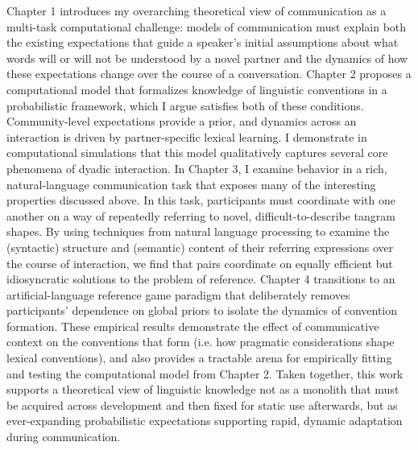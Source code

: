 Chapter 1 introduces my overarching theoretical view of communication as a multi-task computational challenge: models of communication must explain both the existing expectations that guide a speaker's initial assumptions about what words will or will not be understood by a novel partner and the dynamics of how these expectations change over the course of a conversation. %
Chapter 2 proposes a computational model that formalizes knowledge of linguistic conventions in a probabilistic framework, which I argue satisfies both of these conditions.
Community-level expectations provide a prior, and dynamics across an interaction is driven by partner-specific lexical learning. 
I demonstrate in computational simulations that this model qualitatively captures several core phenomena of dyadic interaction.
In Chapter 3, I examine behavior in a rich, natural-language communication task that exposes many of the interesting properties discussed above. 
In this task, participants must coordinate with one another on a way of repeatedly referring to novel, difficult-to-describe tangram shapes. 
By using techniques from natural language processing to examine the (syntactic) structure and (semantic) content of their referring expressions over the course of interaction, we find that pairs coordinate on equally efficient but idiosyncratic solutions to the problem of reference.
Chapter 4 transitions to an artificial-language reference game paradigm that deliberately removes participants' dependence on global priors to isolate the dynamics of convention formation. 
These empirical results demonstrate the effect of communicative context on the conventions that form (i.e. how pragmatic considerations shape lexical conventions), and also provides a tractable arena for empirically fitting and testing the computational model from Chapter 2.
Taken together, this work supports a theoretical view of linguistic knowledge not as a monolith that must be acquired across development and then fixed for static use afterwards, but as ever-expanding probabilistic expectations supporting rapid, dynamic adaptation during communication.
